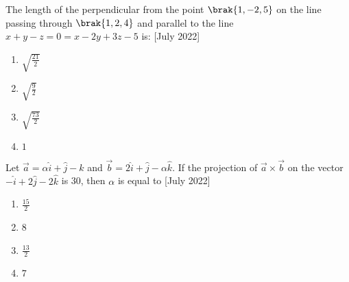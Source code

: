         \item The length of the perpendicular from the point $\brak{1,-2,5}$ on the line passing through $\brak{1,2,4}$ and parallel to the line $x+y-z = 0 = x-2y+3z-5$ is: \hfill{[July 2022]}
        \begin{multicols}{2}
            \begin{enumerate}
                \item $\sqrt{\frac{21}{2}}$
                \item $\sqrt{\frac{9}{2}}$
                \item $\sqrt{\frac{73}{2}}$
                \item $1$
            \end{enumerate}
        \end{multicols}
       \item  Let $\vec{a}=\alpha \hat{i} + \hat{j} - \hat{k}$ and $\vec{b} = 2\hat{i}+\hat{j}-\alpha\hat{k}$. If the projection of $\vec{a} \times \vec{b}$ on the vector $-\hat{i}+2\hat{j}-2\hat{k}$ is 30, then $\alpha$ is equal to \hfill{[July 2022]}
       \begin{multicols}{2}
           \begin{enumerate}
               \item $\frac{15}{2}$
               \item 8
               \item $\frac{13}{2}$
               \item $7$
           \end{enumerate}
       \end{multicols}
    
%
